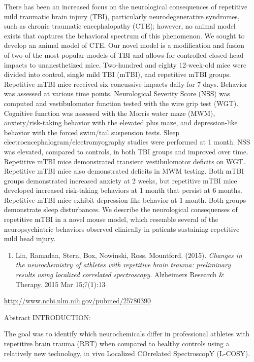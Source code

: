 \documentclass[
]{report}
\providecommand{\tightlist}{%
  \setlength{\itemsep}{0pt}\setlength{\parskip}{0pt}}
\begin{document}
There has been an increased focus on the neurological consequences of repetitive mild traumatic brain injury (TBI), particularly neurodegenerative syndromes, such as chronic traumatic encephalopathy (CTE); however, no animal model exists that captures the behavioral spectrum of this phenomenon. We sought to develop an animal model of CTE. Our novel model is a modification and fusion of two of the most popular models of TBI and allows for controlled closed-head impacts to unanesthetized mice. Two-hundred and eighty 12-week-old mice were divided into control, single mild TBI (mTBI), and repetitive mTBI groups. Repetitive mTBI mice received six concussive impacts daily for 7 days. Behavior was assessed at various time points. Neurological Severity Score (NSS) was computed and vestibulomotor function tested with the wire grip test (WGT). Cognitive function was assessed with the Morris water maze (MWM), anxiety/risk-taking behavior with the elevated plus maze, and depression-like behavior with the forced swim/tail suspension tests. Sleep electroencephalogram/electromyography studies were performed at 1 month. NSS was elevated, compared to controls, in both TBI groups and improved over time. Repetitive mTBI mice demonstrated transient vestibulomotor deficits on WGT. Repetitive mTBI mice also demonstrated deficits in MWM testing. Both mTBI groups demonstrated increased anxiety at 2 weeks, but repetitive mTBI mice developed increased risk-taking behaviors at 1 month that persist at 6 months. Repetitive mTBI mice exhibit depression-like behavior at 1 month. Both groups demonstrate sleep disturbances. We describe the neurological consequenses of repetitive mTBI in a novel mouse model, which resemble several of the neuropsychiatric behaviors observed clinically in patients sustaining repetitive mild head injury.

\begin{enumerate}
\def\labelenumi{\arabic{enumi}.}
\setcounter{enumi}{1}
\tightlist
\item
  Lin, Ramadan, Stern, Box, Nowinski, Ross, Mountford. (2015). \emph{Changes in the neurochemistry of athletes with repetitive brain trauma: preliminary results using localized correlated spectroscopy.} Alzheimers Research \& Therapy.
  2015 Mar 15;7(1):13
\end{enumerate}

\url{http://www.ncbi.nlm.nih.gov/pubmed/25780390}

Abstract
INTRODUCTION:

The goal was to identify which neurochemicals differ in professional athletes with repetitive brain trauma (RBT) when compared to healthy controls using a relatively new technology, in vivo Localized COrrelated SpectroscopY (L-COSY).
\end{document}

